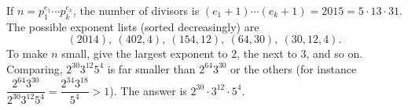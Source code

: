 If $n=p_1^{e_1}\cdots p_k^{e_k}$, the number of divisors is $(e_1+1)\cdots(e_k+1)=2015=5\cdot13\cdot31$. The possible exponent lists (sorted decreasingly) are
\[(2014),\ (402,4),\ (154,12),\ (64,30),\ (30,12,4).\]
To make $n$ small, give the largest exponent to $2$, the next to $3$, and so on. Comparing, $2^{30}3^{12}5^4$ is far smaller than $2^{64}3^{30}$ or the others (for instance $\dfrac{2^{64}3^{30}}{2^{30}3^{12}5^4}=\dfrac{2^{34}3^{18}}{5^4}>1$). The answer is $\boxed{2^{30}\cdot3^{12}\cdot5^4}$.
